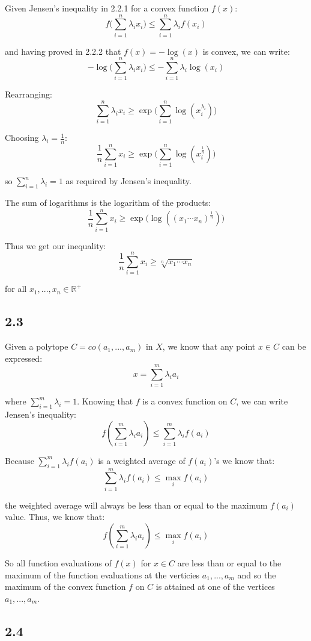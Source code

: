 \documentclass[12pt]{article}
\begin{document}
Given Jensen's inequality in 2.2.1 for a convex function $f(x)$:
\[f\bigg(\sum_{i=1}^n \lambda_i x_i\bigg) \leq \sum_{i=1}^n \lambda_i f(x_i)\]

and having proved in 2.2.2 that $f(x) = -\log(x)$ is convex, we can write:
\[-\log\bigg(\sum_{i=1}^n \lambda_i x_i\bigg) \leq - \sum_{i=1}^n \lambda_i \log(x_i)\]

Rearranging:
\[\sum_{i=1}^n \lambda_i x_i \geq \exp \bigg(\sum_{i=1}^n \log(x_i^{\lambda_i}) \bigg)\]


Choosing $\lambda_i = \frac{1}{n}$:
\[\frac{1}{n}\sum_{i=1}^n x_i \geq \exp \bigg(\sum_{i=1}^n \log(x_i^{\frac{1}{n}}) \bigg)\]

so $\sum_{i=1}^{n} \lambda_i = 1$ as required by Jensen's inequality.

The sum of logarithms is the logarithm of the products:
\[\frac{1}{n}\sum_{i=1}^n x_i \geq \exp \bigg(\log((x_1 \cdots x_n )^{\frac{1}{n}})\bigg)\]

Thus we get our inequality:
\[\frac{1}{n}\sum_{i=1}^n x_i \geq \sqrt[n]{x_1 \cdots x_n}\]

for all $x_1, ..., x_n \in \mathbb{R}^+$ \square

\subsection*{2.3}

Given a polytope $C=co(a_1, ..., a_m)$ in $X$, we know that any point $x \in C$ can be expressed:
\[x = \sum_{i=1}^{m} \lambda_i a_i \]

where $\sum_{i=1}^{m} \lambda_i = 1$. Knowing that $f$ is a convex function on $C$, we can write Jensen's inequality:
\[f\left(\sum_{i=1}^{m} \lambda_i a_i \right) \leq \sum_{i=1}^{m} \lambda_i f(a_i)\]

Because $\sum_{i=1}^{m} \lambda_i f(a_i)$ is a weighted average of $f(a_i)$'s we know that:
\[\sum_{i=1}^{m} \lambda_i f(a_i) \leq \max_{i} f(a_i)\]

the weighted average will always be less than or equal to the maximum $f(a_i)$ value. Thus, we know that:
\[f\left(\sum_{i=1}^{m} \lambda_i a_i \right) \leq \max_{i} f(a_i)\]

So all function evaluations of $f(x)$ for $x \in C$ are less than or equal to the maximum of the function evaluations at the verticies $a_1, ..., a_m$ and so the maximum of the convex function $f$ on $C$ is attained at one of the vertices $a_1, ..., a_m$.
\square

\subsection*{2.4}
\end{document}
